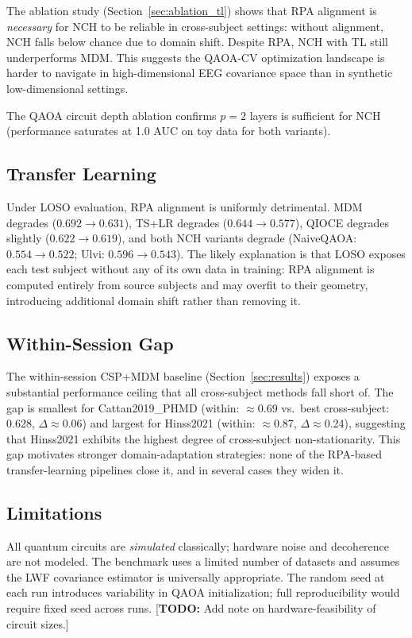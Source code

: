 \documentclass{article}
\newcommand{\todo}[1]{{\textcolor{todocolor}{[\textbf{TODO:} #1]}}}
\begin{document}
The ablation study (Section~\ref{sec:ablation_tl}) shows that RPA alignment
is \emph{necessary} for NCH to be reliable in cross-subject settings: without
alignment, NCH falls below chance due to domain shift.  Despite RPA, NCH
with TL still underperforms MDM.  This suggests the QAOA-CV optimization
landscape is harder to navigate in high-dimensional EEG covariance space
than in synthetic low-dimensional settings.

The QAOA circuit depth ablation confirms $p=2$ layers is sufficient
for NCH (performance saturates at 1.0 AUC on toy data for both variants).

\subsection{Transfer Learning}

Under LOSO evaluation, RPA alignment is uniformly detrimental.  MDM degrades
($0.692 \to 0.631$), TS+LR degrades ($0.644 \to 0.577$), QIOCE degrades
slightly ($0.622 \to 0.619$), and both NCH variants degrade (NaiveQAOA:
$0.554 \to 0.522$; Ulvi: $0.596 \to 0.543$).  The likely explanation is that
LOSO exposes each test subject without any of its own data in training: RPA
alignment is computed entirely from source subjects and may overfit to their
geometry, introducing additional domain shift rather than removing it.

\subsection{Within-Session Gap}

The within-session CSP+MDM baseline (Section~\ref{sec:results}) exposes a
substantial performance ceiling that all cross-subject methods fall short of.
The gap is smallest for Cattan2019\_PHMD (within: $\approx$0.69 vs.\ best
cross-subject: 0.628, $\Delta\approx$0.06) and largest for Hinss2021
(within: $\approx$0.87, $\Delta\approx$0.24), suggesting that Hinss2021
exhibits the highest degree of cross-subject non-stationarity.
This gap motivates stronger domain-adaptation strategies: none of the
RPA-based transfer-learning pipelines close it, and in several cases they
widen it.

\subsection{Limitations}

All quantum circuits are \emph{simulated} classically; hardware noise and
decoherence are not modeled.  The benchmark uses a limited number of datasets
and assumes the LWF covariance estimator is universally appropriate.  The
random seed at each run introduces variability in QAOA initialization; full
reproducibility would require fixed seed across runs.
\todo{Add note on hardware-feasibility of circuit sizes.}
\end{document}
